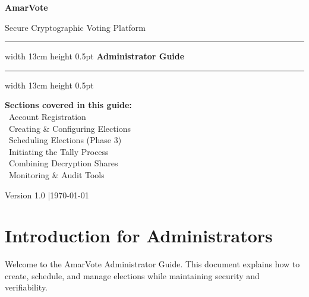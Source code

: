 \documentclass[12pt,a4paper]{book}
\begin{document}
\begin{titlepage}
\pagecolor{coverbg}
\color{white}
\centering
\vspace*{1.5cm}

{\fontsize{55}{60}\selectfont\bfseries AmarVote}

\vspace{0.4cm}
{\large\color{adminaccent} Secure Cryptographic Voting Platform}

\vspace{1.5cm}
\hrule width 13cm height 0.5pt
\vspace{0.5cm}
{\LARGE\bfseries \faCog\quad Administrator Guide}
\vspace{0.5cm}
\hrule width 13cm height 0.5pt

\vspace{2cm}

\begin{tcolorbox}[
  enhanced,width=11cm,
  colback=adminred!30!black,colframe=adminaccent,
  arc=6pt,boxrule=1.5pt,left=14pt,right=14pt,top=10pt,bottom=10pt
]
\centering\color{white}
\textbf{Sections covered in this guide:}\\[8pt]
\textcolor{adminaccent}{\faUserShield} \, Account Registration \\[4pt]
\textcolor{adminaccent}{\faPlusCircle} \, Creating \& Configuring Elections\\[4pt]
\textcolor{adminaccent}{\faCalendarAlt} \, Scheduling Elections (Phase 3)\\[4pt]
\textcolor{adminaccent}{\faChartBar} \, Initiating the Tally Process\\[4pt]
\textcolor{adminaccent}{\faLayerGroup} \, Combining Decryption Shares\\[4pt]
\textcolor{adminaccent}{\faSearch} \, Monitoring \& Audit Tools
\end{tcolorbox}

\vfill
{\small\color{sectiongray} Version 1.0 \quad|\quad \today}
\end{titlepage}
\nopagecolor\color{black}

\frontmatter
\tableofcontents

\chapter*{Introduction for Administrators}

Welcome to the AmarVote Administrator Guide. This document explains how to create, schedule, and manage elections while maintaining security and verifiability.
\end{document}

